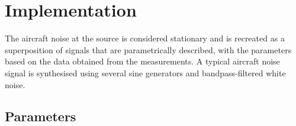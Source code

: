 \chapter{Implementation}

The aircraft noise at the source is considered stationary and is recreated as a 
superposition of signals that are parametrically described, with the parameters 
based on the data obtained from the measurements. A typical aircraft noise 
signal is synthesised using several sine generators and 
bandpass-filtered white noise.

\section{Parameters}




